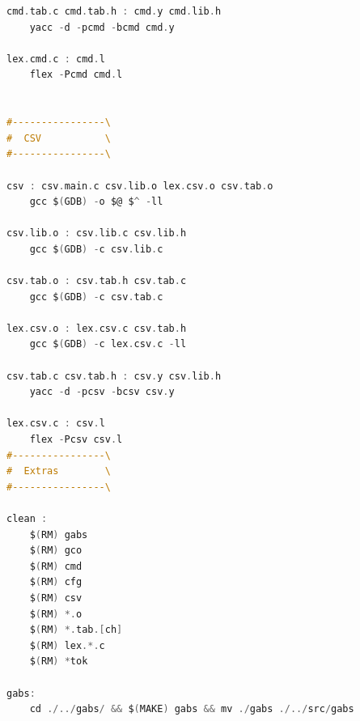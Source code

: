 \documentclass[11pt, a4paper, oneside]{article}
\begin{document}
\begin{lstlisting}[language=C, caption={Makefile }]
cmd.tab.c cmd.tab.h : cmd.y cmd.lib.h
	yacc -d -pcmd -bcmd cmd.y

lex.cmd.c : cmd.l
	flex -Pcmd cmd.l


#----------------\
#  CSV           \
#----------------\

csv : csv.main.c csv.lib.o lex.csv.o csv.tab.o
	gcc $(GDB) -o $@ $^ -ll

csv.lib.o : csv.lib.c csv.lib.h
	gcc $(GDB) -c csv.lib.c

csv.tab.o : csv.tab.h csv.tab.c
	gcc $(GDB) -c csv.tab.c

lex.csv.o : lex.csv.c csv.tab.h
	gcc $(GDB) -c lex.csv.c -ll

csv.tab.c csv.tab.h : csv.y csv.lib.h
	yacc -d -pcsv -bcsv csv.y

lex.csv.c : csv.l
	flex -Pcsv csv.l
#----------------\
#  Extras        \
#----------------\

clean :
	$(RM) gabs
	$(RM) gco
	$(RM) cmd
	$(RM) cfg
	$(RM) csv
	$(RM) *.o
	$(RM) *.tab.[ch]
	$(RM) lex.*.c
	$(RM) *tok

gabs:
	cd ./../gabs/ && $(MAKE) gabs && mv ./gabs ./../src/gabs

\end{lstlisting}
\newpage
\end{document}
